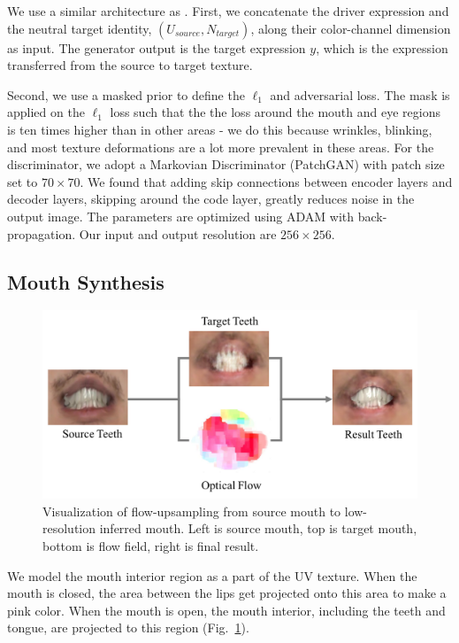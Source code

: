 We use a similar architecture as \cite{pix2pix}. 
First, we concatenate the driver expression and the neutral target identity, $(U_{source}, N_{target})$, along their color-channel dimension as input.
The generator output is the target expression $y$, which is the expression transferred from the source to target texture.

Second, we use a masked prior to define the $\ell_1$ and adversarial loss. 
The mask is applied on the $\ell_1$ loss such that the the loss around the mouth and eye regions is ten times higher than in other areas - we
do this because wrinkles, blinking, and most texture deformations are a lot more prevalent in these areas.  
For the discriminator, we adopt a Markovian Discriminator 
(PatchGAN) with patch size set to $70 \times 70$. We found that adding skip connections between
encoder layers and decoder layers, skipping around the code layer, greatly reduces noise in the output image. 
The parameters are
optimized using ADAM with back-propagation. Our input and output resolution are $256\times 256$.



\subsection{Mouth Synthesis}

\begin{figure}[h]
	\centering
	\includegraphics[width=1\linewidth]{figures/flow/opticalflow2.png}
	\caption{Visualization of flow-upsampling from source mouth to low-resolution inferred mouth.  Left is source mouth, top is target mouth, bottom is flow field, right is final result.}\label{fig:flow}
	\vspace{-0.05in}
\end{figure}
We model the mouth interior region as a part of the UV texture.  When the mouth is closed, the area between the lips get projected onto this area to
make a pink color.  When the mouth is open, the mouth interior, including the teeth and tongue, are projected to this region (Fig.~\ref{fig:flow}).  

